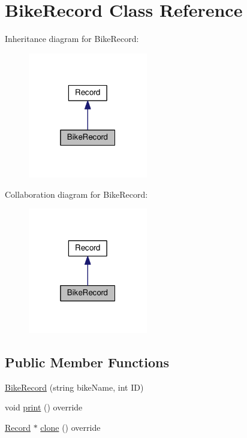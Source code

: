 \hypertarget{classBikeRecord}{}\section{Bike\+Record Class Reference}
\label{classBikeRecord}


Inheritance diagram for Bike\+Record\+:\nopagebreak
\begin{figure}[H]
\begin{center}
\leavevmode
\includegraphics[width=148pt]{classBikeRecord__inherit__graph}
\end{center}
\end{figure}


Collaboration diagram for Bike\+Record\+:\nopagebreak
\begin{figure}[H]
\begin{center}
\leavevmode
\includegraphics[width=148pt]{classBikeRecord__coll__graph}
\end{center}
\end{figure}
\subsection*{Public Member Functions}
\begin{DoxyCompactItemize}
\item 
\hyperlink{classBikeRecord_aeb895d757c28796857eac6f246098e45}{Bike\+Record} (string bike\+Name, int ID)
\item 
void \hyperlink{classBikeRecord_a84eee4b442a8a82a131f595915a3f4ce}{print} () override
\item 
\hyperlink{classRecord}{Record} $\ast$ \hyperlink{classBikeRecord_a306fa32f6acb1c27a2e2d2f353cff9c8}{clone} () override
\end{DoxyCompactItemize}

